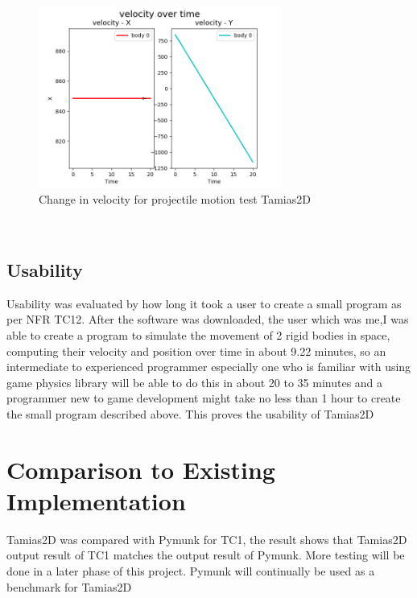 \documentclass[12pt, titlepage]{article}
\newcommand{\progname}{Tamias2D}
\begin{document}
\begin{figure}[htbp]
	
	\begin{center}
		
		{
			\includegraphics[width=0.71\textwidth]{projectile_60v.png}
			
		} 
		\caption{\label{Fig_projectile_60v}Change in velocity for projectile motion test \progname{}}
		
	\end{center}
	
\end{figure}
~\newpage
\subsection{Usability}
Usability was evaluated by how long it took a user to create a small program as per NFR TC12. After the software was downloaded, the user which was me,I was able to create a program to simulate the movement of 2 rigid bodies in space, computing their velocity and position over time in about 9.22 minutes, so an intermediate to experienced programmer especially one who is familiar with using game physics library will be able to do this in about 20 to 35 minutes and a programmer new to game development might take no less than 1 hour to create the small program described above. This proves the usability of \progname{}
	
\section{Comparison to Existing Implementation}	
\progname{} was compared with Pymunk for TC1, the result shows that \progname{} output result of TC1 matches the output result of Pymunk. More testing will be done in a later phase of this project. Pymunk will continually be used as a benchmark for \progname{}
\end{document}
